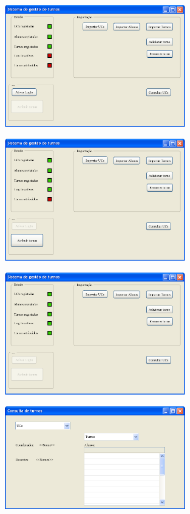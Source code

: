 \documentclass[12pt,a4paper]{report}
\begin{document}
\begin{appendices}
\begin{figure}[H]
	\centering 
	\includegraphics[width=0.7\textwidth]{modelacao/mockups/admin11100.png}  
\end{figure}

\begin{figure}[H]
	\centering 
	\includegraphics[width=0.7\textwidth]{modelacao/mockups/admin11110.png}  
\end{figure}

\begin{figure}[H]
	\centering 
	\includegraphics[width=0.7\textwidth]{modelacao/mockups/admin11111.png}  
\end{figure}

\begin{figure}[H]
	\centering 
	\includegraphics[width=0.7\textwidth]{modelacao/mockups/adminconsultarucs.png}  
\end{figure}

\end{appendices}
\end{document}
